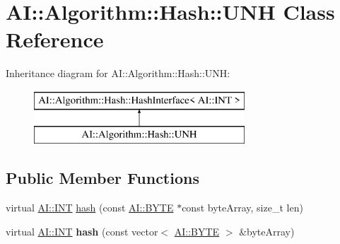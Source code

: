\hypertarget{classAI_1_1Algorithm_1_1Hash_1_1UNH}{\section{A\-I\-:\-:Algorithm\-:\-:Hash\-:\-:U\-N\-H Class Reference}
\label{classAI_1_1Algorithm_1_1Hash_1_1UNH}
}
Inheritance diagram for A\-I\-:\-:Algorithm\-:\-:Hash\-:\-:U\-N\-H\-:\begin{figure}[H]
\begin{center}
\leavevmode
\includegraphics[height=2.000000cm]{classAI_1_1Algorithm_1_1Hash_1_1UNH}
\end{center}
\end{figure}
\subsection*{Public Member Functions}
\begin{DoxyCompactItemize}
\item 
virtual \hyperlink{namespaceAI_ac74584e573f07aa4194b461b1ba7be64}{A\-I\-::\-I\-N\-T} \hyperlink{classAI_1_1Algorithm_1_1Hash_1_1UNH_acc52e3c2f323e748882ee5d9d66be698}{hash} (const \hyperlink{namespaceAI_a9d4bcda82fe0f9aac3c4861e24491581}{A\-I\-::\-B\-Y\-T\-E} $\ast$const byte\-Array, size\-\_\-t len)
\item 
\hypertarget{classAI_1_1Algorithm_1_1Hash_1_1UNH_aacaaa8356755304f4bc1455cf18f16df}{virtual \hyperlink{namespaceAI_ac74584e573f07aa4194b461b1ba7be64}{A\-I\-::\-I\-N\-T} {\bfseries hash} (const vector$<$ \hyperlink{namespaceAI_a9d4bcda82fe0f9aac3c4861e24491581}{A\-I\-::\-B\-Y\-T\-E} $>$ \&byte\-Array)}\label{classAI_1_1Algorithm_1_1Hash_1_1UNH_aacaaa8356755304f4bc1455cf18f16df}

\end{DoxyCompactItemize}


